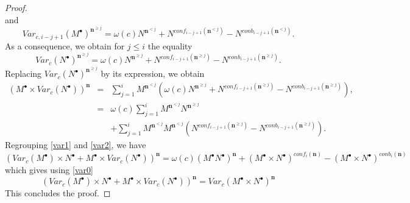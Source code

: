 \documentclass[10pt,a4paper]{amsart}
\def\di{\displaystyle}
\def\nn{\mathbf{n}}
\begin{document}
\begin{proof}
\begin{equation}
\end{equation}
and
\begin{equation}
Var_{c,i-j+1} (M^{\bullet} )^{\nn^{\geq j}} = \omega (c) N^{\nn^{<j}} + N^{conf_{i-j+1} (\nn^{<j} )} -N^{conb_{i-j+1} (\nn^{<j} )} .
\end{equation}
As a consequence, we obtain for $j\leq i$ the equality
\begin{equation}
    Var_c (N^{\bullet} ) ^{\nn^{\geq j }} = \omega (c) N^{\nn^{\geq j}} + N^{conf_{i-j+1} (\nn^{\geq j} )} -N^{conb_{i-j+1} (\nn^{\geq j} )} . 
\end{equation}
Replacing $Var_c (N^{\bullet})^{\nn^{\geq j}}$ by its expression, we obtain
\begin{equation}
\label{var2}
\left .
\begin{array}{lll}
\left (     M^{\bullet}\times Var_c (N^{\bullet} ) \right ) ^{\nn} & = &  \di\sum_{j=1}^{i} M^{\nn^{<j}} \left ( \omega (c) N^{\nn^{\geq j}} + N^{conf_{i-j+1} (\nn^{\geq j} )} -N^{conb_{i-j+1} (\nn^{\geq j} )} \right ) ,\\
 & = & \omega (c) \di\sum_{j=1}^{i} M^{\nn^{<j}} N^{\nn^{\geq j}}\\
 &    & 
 +\di\sum_{j=1}^{i} M^{\nn^{<j}} M^{\nn^{<j}} \left ( N^{conf_{i-j+1} (\nn^{\geq j} )} -N^{conb_{i-j+1} (\nn^{\geq j} )} \right ) .
\end{array}
\right .
\end{equation}
Regrouping \eqref{var1} and \eqref{var2}, we have 
\begin{equation}
    \left (  Var_c (M^{\bullet})\times N^{\bullet} + 
    M^{\bullet}\times Var_c (N^{\bullet} ) \right ) ^{\nn} =
    \omega (c) \left ( M^{\bullet} N^{\bullet} \right )^{\nn} + (M^{\bullet} \times N^{\bullet} )^{conf_i (\nn )} - 
    (M^{\bullet} \times N^{\bullet} )^{conb_i (\nn )}
\end{equation}
which gives using \eqref{var0}
\begin{equation}
\left (  Var_c (M^{\bullet})\times N^{\bullet} + 
    M^{\bullet}\times Var_c (N^{\bullet} ) \right ) ^{\nn} =   Var_c (M^{\bullet} \times N^{\bullet})^{\nn} 
\end{equation}
This concludes the proof.
\end{proof}
\end{document}
